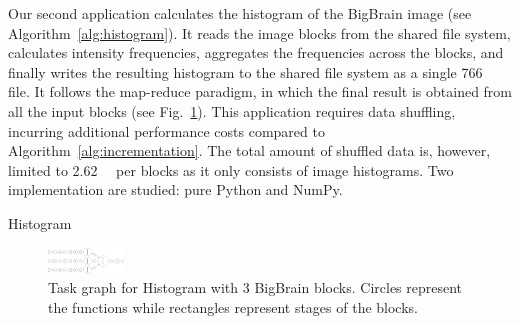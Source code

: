 \documentclass[conference]{IEEEtran}
\begin{document}
 Our second application calculates the histogram of the BigBrain image (see
 Algorithm~\ref{alg:histogram}). It reads the image blocks from the shared file
 system, calculates intensity frequencies, aggregates the frequencies across the
 blocks, and finally writes the resulting histogram to the shared file system as a
 single \SI{766}{\kilo\byte} file. It follows the map-reduce
 paradigm, in which the final result is obtained from all the input blocks (see
 Fig.~\ref{fig:tg-histo}). This application requires data shuffling, incurring 
 additional performance costs compared to Algorithm~\ref{alg:incrementation}.
 The total amount of shuffled data is, however, limited to
 \SI{2.62}{\mega\byte} per blocks as it only consists of image histograms.
Two implementation are studied: pure Python and NumPy.

\begin{algorithm}[!t]
    \caption{Histogram}\label{alg:histogram}
    \begin{algorithmic}
    \EndFor
    

    \end{algorithmic}
\end{algorithm}

\begin{figure}[!t]
    \centering
    \includegraphics[width=2cm, height=\columnwidth,
    angle=-90]{images/histogram-task-graph.png}
    \caption{Task graph for Histogram with 3 BigBrain blocks. Circles represent the
    functions while rectangles represent stages of the blocks.
    }\label{fig:tg-histo}
\end{figure}
\end{document}
